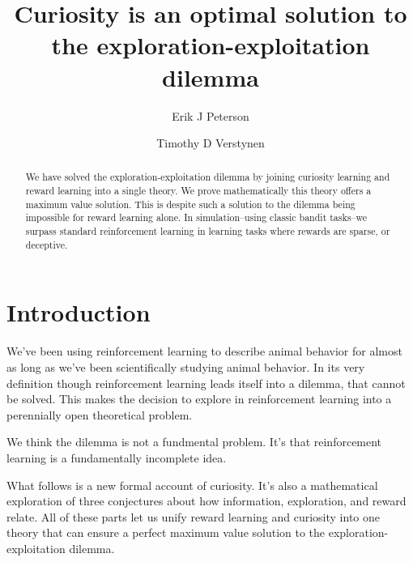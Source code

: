 \documentclass[9pt,lineno]{elife}
\title{Curiosity is an optimal solution to the exploration-exploitation dilemma}
\author[1,2*]{Erik J Peterson}
\author[1,2,3,4]{Timothy D Verstynen}
\affil[1]{Department of Psychology}
\affil[2]{Center for the Neural Basis of Cognition}
\affil[3]{Carnegie Mellon Neuroscience Institute}
\affil[4]{Biomedical Engineering, Carnegie Mellon University, Pittsburgh PA}
\begin{document}
\maketitle
\begin{abstract}
We have solved the exploration-exploitation dilemma by joining curiosity learning and reward learning into a single theory. We prove mathematically this theory offers a maximum value solution. This is despite such a solution to the dilemma being impossible for reward learning alone. In simulation--using classic bandit tasks--we surpass standard reinforcement learning in learning tasks where rewards are sparse, or deceptive. 
\end{abstract}

\section{Introduction}
We've been using reinforcement learning to describe animal behavior for almost as long as we've been scientifically studying animal behavior. In its very definition though reinforcement learning leads itself into a dilemma, that cannot be solved. This makes the decision to explore in reinforcement learning into a perennially open theoretical problem.

We think the dilemma is not a fundmental problem. It's that reinforcement learning is a fundamentally incomplete idea. 

What follows is a new formal account of curiosity. It's also a mathematical exploration of three conjectures about how information, exploration, and reward relate. All of these parts let us unify reward learning and curiosity into one theory that can ensure a perfect maximum value solution to the exploration-exploitation dilemma.

\end{document}
